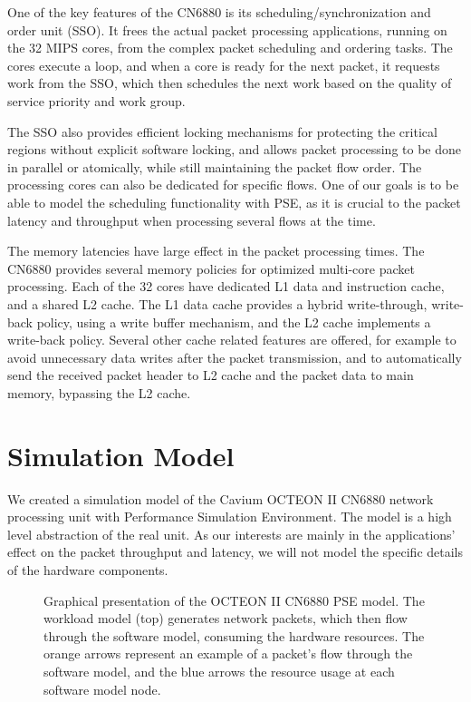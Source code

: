 One of the key features of the CN6880 is its scheduling/synchronization and order unit (SSO). It frees the actual packet processing applications, running on the 32 MIPS cores, from the complex packet scheduling and ordering tasks. The cores execute a loop, and when a core is ready for the next packet, it requests work from the SSO, which then schedules the next work based on the quality of service priority and work group.~\cite{cavium:2010:fundamentals}

The SSO also provides efficient locking mechanisms for protecting the critical regions without explicit software locking, and allows packet processing to be done in parallel or atomically, while still maintaining the packet flow order. The processing cores can also be dedicated for specific flows. One of our goals is to be able to model the scheduling functionality with PSE, as it is crucial to the packet latency and throughput when processing several flows at the time.~\cite{cavium:2010:fundamentals}

The memory latencies have large effect in the packet processing times. The CN6880 provides several memory policies for optimized multi-core packet processing. Each of the 32 cores have dedicated L1 data and instruction cache, and a shared L2 cache. The L1 data cache provides a hybrid write-through, write-back policy, using a write buffer mechanism, and the L2 cache implements a write-back policy. Several other cache related features are offered, for example to avoid unnecessary data writes after the packet transmission, and to automatically send the received packet header to L2 cache and the packet data to main memory, bypassing the L2 cache.~\cite{cavium:2010:fundamentals}

\section{Simulation Model}
\label{sec:simulation-model}

We created a simulation model of the Cavium OCTEON II CN6880 network processing unit with Performance Simulation Environment. The model is a high level abstraction of the real unit. As our interests are mainly in the applications' effect on the packet throughput and latency, we will not model the specific details of the hardware components.

\begin{figure}[h]
  \begin{center}
    \caption{Graphical presentation of the OCTEON II CN6880 PSE model. The workload model (top) generates network packets, which then flow through the software model, consuming the hardware resources. The orange arrows represent an example of a packet's flow through the software model, and the blue arrows the resource usage at each software model node.}
    \label{fig:full-model}
  \end{center}
\end{figure}

